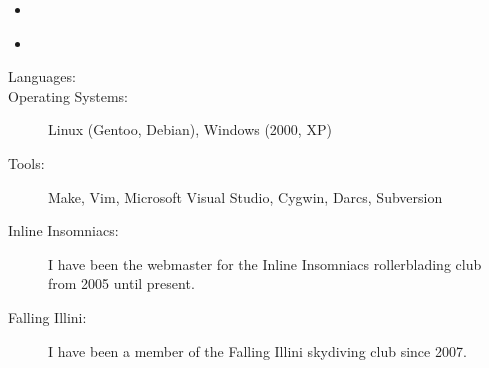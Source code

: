 \documentclass[letterpaper,10pt]{article}
\begin{document}
\begin{itemize}
\begin{itemize}
    \end{itemize}
\item {}
    \begin{itemize}
    \end{itemize}
\item {}
    \begin{itemize}
    \end{itemize}
\end{itemize}
\begin{description}
\item[Languages:]
\begin{minipage}[t]{6.5in}
\end{minipage}
\item[Operating Systems:] Linux (Gentoo, Debian), Windows (2000, XP)
\item[Tools:] Make, Vim, Microsoft Visual Studio, Cygwin, Darcs, Subversion
\end{description}
\begin{description}
\item[Inline Insomniacs:] I have been the webmaster for the Inline Insomniacs rollerblading club from 2005 until present.
\item[Falling Illini:] I have been a member of the Falling Illini skydiving club since 2007.
\end{description}
\end{document}
